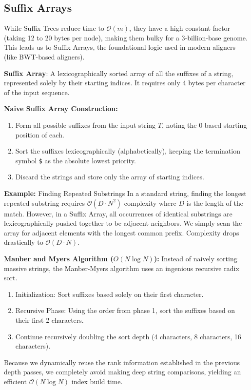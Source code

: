 \documentclass[11pt,a4paper]{article}
\newenvironment{important}{
    \vspace{1em}
    \begin{tcolorbox}[colback=blue!5!white, colframe=blue!75!black, boxrule=1pt, arc=4pt, left=10pt, right=10pt, top=10pt, bottom=10pt]
}{
    \end{tcolorbox}
    \vspace{1em}
}
\begin{document}
\subsection{Suffix Arrays}

While Suffix Trees reduce time to $\mathcal{O}(m)$, they have a high constant factor (taking 12 to 20 bytes per node), making them bulky for a 3-billion-base genome. This leads us to Suffix Arrays, the foundational logic used in modern aligners (like BWT-based aligners).

\begin{important}
  \textbf{Suffix Array}: A lexicographically sorted array of all the suffixes of a string, represented solely by their starting indices. It requires only 4 bytes per character of the input sequence.
\end{important}

\textbf{Naive Suffix Array Construction:}
\begin{enumerate}
    \item Form all possible suffixes from the input string $T$, noting the 0-based starting position of each.
    \item Sort the suffixes lexicographically (alphabetically), keeping the termination symbol \texttt{\$} as the absolute lowest priority.
    \item Discard the strings and store only the array of starting indices.
\end{enumerate}

\textbf{Example:} Finding Repeated Substrings
In a standard string, finding the longest repeated substring requires $\mathcal{O}(D \cdot N^2)$ complexity where $D$ is the length of the match. However, in a Suffix Array, all occurrences of identical substrings are lexicographically pushed together to be adjacent neighbors. We simply scan the array for adjacent elements with the longest common prefix. Complexity drops drastically to $\mathcal{O}(D \cdot N)$.

\textbf{Manber and Myers Algorithm ($O(N \log N)$):}
Instead of naively sorting massive strings, the Manber-Myers algorithm uses an ingenious recursive radix sort.
\begin{enumerate}
    \item Initialization: Sort suffixes based solely on their first character.
    \item Recursive Phase: Using the order from phase 1, sort the suffixes based on their first 2 characters.
    \item Continue recursively doubling the sort depth (4 characters, 8 characters, 16 characters).
\end{enumerate}
Because we dynamically reuse the rank information established in the previous depth passes, we completely avoid making deep string comparisons, yielding an efficient $\mathcal{O}(N \log N)$ index build time.
\end{document}
